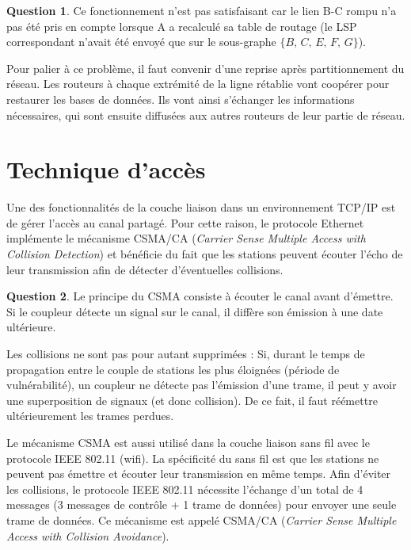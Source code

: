 \documentclass[11pt,english,french]{scrreprt}
\theoremstyle{remark}
\theoremstyle{definition}
\newtheorem{ques}{Question}[section]
\begin{document}
\begin{ques}
	Ce fonctionnement n'est pas satisfaisant car le lien B-C rompu n'a pas été pris en compte lorsque A a recalculé sa table de routage (le LSP correspondant n'avait été envoyé que sur le sous-graphe $\{B,\,C,\,E,\,F,\,G\}$).
	
	Pour palier à ce problème, il faut convenir d'une reprise après partitionnement du réseau. Les routeurs à chaque extrémité de la ligne rétablie vont coopérer pour restaurer les bases de données. Ils vont ainsi s'échanger les informations nécessaires, qui sont ensuite diffusées aux autres routeurs de leur partie de réseau.
\end{ques}

\section{Technique d'accès} %

Une des fonctionnalités de la couche liaison dans un environnement TCP/IP est de gérer l'accès au canal partagé. Pour cette raison, le protocole Ethernet implémente le mécanisme CSMA/CA (\emph{Carrier Sense Multiple Access with Collision Detection}) et bénéficie du fait que les stations peuvent écouter l'écho de leur transmission afin de détecter d'éventuelles collisions.

\begin{ques}
	Le principe du CSMA consiste à écouter le canal avant d'émettre. Si le coupleur détecte un signal sur le canal, il diffère son émission à une date ultérieure.
	
	Les collisions ne sont pas pour autant supprimées : Si, durant le temps de propagation entre le couple de stations les plus éloignées (période de vulnérabilité), un coupleur ne détecte pas l'émission d'une trame, il peut y avoir une superposition de signaux (et donc collision). De ce fait, il faut réémettre ultérieurement les trames perdues.
\end{ques}

Le mécanisme CSMA est aussi utilisé dans la couche liaison sans fil avec le protocole IEEE 802.11 (wifi). La spécificité du sans fil est que les stations ne peuvent pas émettre et écouter leur transmission en même temps. Afin d'éviter les collisions, le protocole IEEE 802.11 nécessite l'échange d'un total de 4 messages (3 messages de contrôle + 1 trame de données) pour envoyer une seule trame de données. Ce mécanisme est appelé CSMA/CA (\emph{Carrier Sense Multiple Access with Collision Avoidance}).
\end{document}
